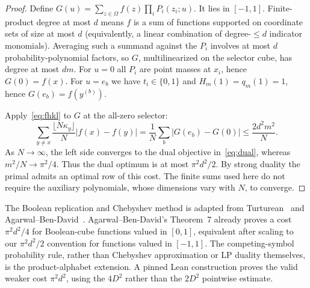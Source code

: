 \documentclass[11pt]{article}
\numberwithin{equation}{section}
\theoremstyle{remark}
\begin{document}
\begin{proof}
Define $G(u)=\sum_{z\in\Omega}f(z)\prod_iP_i(z_i;u)$. It lies in $[-1,1]$. Finite-product degree at most $d$ means $f$ is a sum of functions supported on coordinate sets of size at most $d$ (equivalently, a linear combination of degree-$\le d$ indicator monomials). Averaging such a summand against the $P_i$ involves at most $d$ probability-polynomial factors, so $G$, multilinearized on the selector cube, has degree at most $dm$. For $u=0$ all $P_i$ are point masses at $x_i$, hence $G(0)=f(x)$. For $u=e_b$ we have $t_i\in\{0,1\}$ and $H_m(1)=q_m(1)=1$, hence $G(e_b)=f(y^{(b)})$.

Apply~\eqref{eq:fhkl} to $G$ at the all-zero selector:
\begin{equation}\label{eq:packbound}
 \sum_{y\ne x}\frac{\lfloor N\kappa_y\rfloor}{N}|f(x)-f(y)|
 =\frac1N\sum_b|G(e_b)-G(0)|
 \le\frac{2d^2m^2}{N}.
\end{equation}
As $N\to\infty$, the left side converges to the dual objective in~\eqref{eq:dual}, whereas $m^2/N\to\pi^2/4$. Thus the dual optimum is at most $\pi^2d^2/2$. By strong duality the primal admits an optimal row of this cost. The finite sums used here do not require the auxiliary polynomials, whose dimensions vary with $N$, to converge.
\end{proof}
The Boolean replication and Chebyshev method is adapted from Turturean~\cite[Section~6 and Remark~6.9]{Tur26} and Agarwal--Ben-David~\cite[Theorem~7 and Section~3]{ABD26}. Agarwal--Ben-David's Theorem~7 already proves a cost $\pi^2d^2/4$ for Boolean-cube functions valued in $[0,1]$, equivalent after scaling to our $\pi^2d^2/2$ convention for functions valued in $[-1,1]$. The competing-symbol probability rule, rather than Chebyshev approximation or LP duality themselves, is the product-alphabet extension. A pinned Lean construction proves the valid weaker cost $\pi^2d^2$, using the $4D^2$ rather than the $2D^2$ pointwise estimate.
\end{document}
